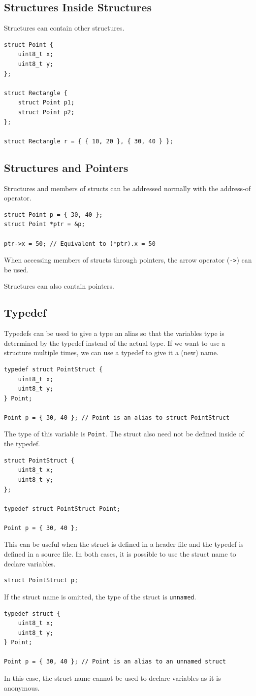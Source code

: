 \documentclass[a4paper]{report}
\begin{document}
\subsection{Structures Inside Structures}
Structures can contain other structures.
\begin{verbatim}
struct Point {
    uint8_t x;
    uint8_t y;
};

struct Rectangle {
    struct Point p1;
    struct Point p2;
};

struct Rectangle r = { { 10, 20 }, { 30, 40 } };
\end{verbatim}
\subsection{Structures and Pointers}
Structures and members of structs can be addressed normally with the address-of operator.
\begin{verbatim}
struct Point p = { 30, 40 };
struct Point *ptr = &p;

ptr->x = 50; // Equivalent to (*ptr).x = 50
\end{verbatim}
When accessing members of structs through pointers, the arrow operator (\texttt{->}) can be used.

Structures can also contain pointers.
\subsection{Typedef}
Typedefs can be used to give a type an alias so that the variables type is
determined by the typedef instead of the actual type.
If we want to use a structure multiple times, we can use a typedef to give it a (new) name.
\begin{verbatim}
typedef struct PointStruct {
    uint8_t x;
    uint8_t y;
} Point;

Point p = { 30, 40 }; // Point is an alias to struct PointStruct
\end{verbatim}
The type of this variable is \texttt{Point}.
The struct also need not be defined inside of the typedef.
\begin{verbatim}
struct PointStruct {
    uint8_t x;
    uint8_t y;
};

typedef struct PointStruct Point;

Point p = { 30, 40 };
\end{verbatim}
This can be useful when the struct is defined in a header file and the typedef is defined in a source file.
In both cases, it is possible to use the struct name to declare variables.
\begin{verbatim}
struct PointStruct p;
\end{verbatim}
If the struct name is omitted, the type of the struct is \texttt{unnamed}.
\begin{verbatim}
typedef struct {
    uint8_t x;
    uint8_t y;
} Point;

Point p = { 30, 40 }; // Point is an alias to an unnamed struct
\end{verbatim}
In this case, the struct name cannot be used to declare variables as it is anonymous.
\end{document}

